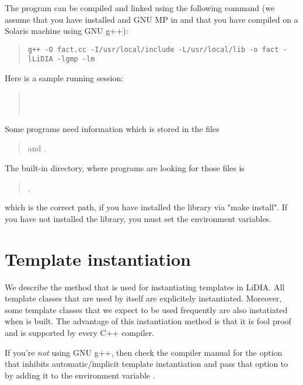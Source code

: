 The program  can be compiled and linked using the following
command (we assume that you have installed \LiDIA and GNU MP in
 and that you have compiled \LiDIA on a Solaris machine
using GNU g++):

\begin{quote}
\begin{verbatim}
g++ -O fact.cc -I/usr/local/include -L/usr/local/lib -o fact -lLiDIA -lgmp -lm
\end{verbatim}
\end{quote}

Here is a sample running session:
\begin{quote}
\\[2ex]
\\[2ex]
\end{quote}

Some programs need information which is stored in the files
\begin{quote}
   and .
\end{quote}

The built-in directory, where programs are looking for those files is
\begin{quote}
  ,
\end{quote}
which is the correct path, if you have installed the library via "make
install".  If you have not installed the library, you must set the
environment variables.



\section{Template instantiation}
\label{template_introduction}
\label{template_introduction2}
\label{template_instantiation}

We describe the method that is used for instantiating templates in LiDIA.
All template classes that are used by \LiDIA itself are explicitely
instantiated.  Moreover, some template classes that we expect to be used
frequently are also instatiated when \LiDIA is built.  The advantage of
this instantiation method is that it is fool proof and is supported by
every C++ compiler.

\attentionI If you're \emph{not} using GNU g++, then check the compiler
manual for the option that inhibits automatic/implicit template
instantiation and pass that option to  by adding it to the
environment variable .

